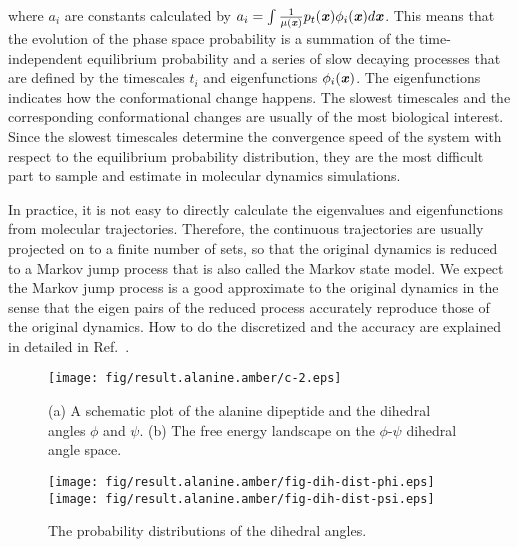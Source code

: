\documentclass[aip,jcp,a4paper,preprint,unsortedaddress,onecolumn,fleqn]{revtex4-1}
\newcommand{\vect}[1]{\textbf{\textit{#1}}}
\begin{document}
where $a_i$ are constants calculated by $a_i = \int \frac{1}{\mu(\vect
  x)} p_t(\vect x)\phi_i(\vect x) d\vect x$. This means that the
evolution of the phase space probability is a summation of the
time-independent equilibrium probability and a series of slow decaying
processes that are defined by the timescales $t_i$ and eigenfunctions
$\phi_i(\vect x)$. The eigenfunctions indicates how the conformational
change happens.
The slowest timescales and the corresponding conformational
changes are usually of the most biological interest.  Since the
slowest timescales determine the convergence speed of the system with
respect to the equilibrium probability distribution, they are the most
difficult part to sample and estimate in molecular dynamics
simulations.

In practice, it is not easy to directly calculate the eigenvalues and
eigenfunctions from molecular trajectories. Therefore, the continuous
trajectories are usually projected on to a finite number of sets, so
that the original dynamics is reduced to a Markov jump process that is
also called the Markov state model. We expect the Markov jump process
is a good approximate to the original dynamics in the sense that the
eigen pairs of the reduced process accurately reproduce those of the
original dynamics. How to do the discretized and the accuracy are
explained in detailed in Ref.~\cite{prinz2011markov}.

\begin{figure}
  \centering  
  \texttt{[image: fig/result.alanine.amber/c-2.eps]}
  \caption{(a) A schematic plot of the alanine dipeptide and the
    dihedral angles $\phi$ and $\psi$. (b) The free energy landscape on the
    $\phi$-$\psi$ dihedral angle space.}
  \label{fig:free-energy}
\end{figure}

\begin{figure}
  \centering
  \texttt{[image: fig/result.alanine.amber/fig-dih-dist-phi.eps]}\\
  \texttt{[image: fig/result.alanine.amber/fig-dih-dist-psi.eps]}
  \caption{The probability distributions of the dihedral angles.}
  \label{fig:dih-dist}
\end{figure}
\end{document}
